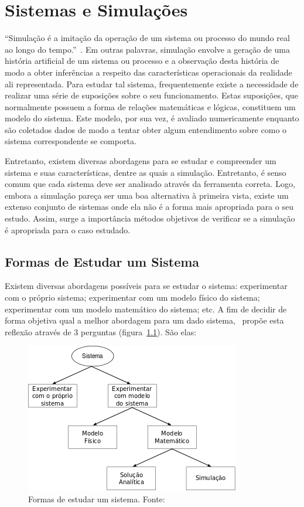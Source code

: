 \chapter{\label{chap:simulation}Sistemas e Simulações}

``Simulação é a imitação da operação de um sistema ou processo do mundo real ao
longo do tempo.''~\cite{Banks}. Em outras palavras, simulação envolve a geração
de uma história artificial de um sistema ou processo e a observação desta
história de modo a obter inferências a respeito das características operacionais
da realidade ali representada. Para estudar tal sistema, frequentemente existe a
necessidade de realizar uma série de suposições sobre o seu funcionamento. Estas
suposições, que normalmente possuem a forma de relações matemáticas e lógicas,
constituem um modelo do sistema. Este modelo, por sua vez, é avaliado
numericamente enquanto são coletados dados de modo a tentar obter algum
entendimento sobre como o sistema correspondente se comporta.

Entretanto, existem diversas abordagens para se estudar e compreender um sistema
e suas características, dentre as quais a simulação. Entretanto, é senso comum
que cada sistema deve ser analisado através da ferramenta correta. Logo, embora
a simulação pareça ser uma boa alternativa à primeira vista, existe um extenso
conjunto de sistemas onde ela não é a forma mais apropriada para o seu estudo.
Assim, surge a importância métodos objetivos de verificar se a simulação é
apropriada para o caso estudado.

\section{\label{chap:waystostudy}Formas de Estudar um Sistema}

Existem diversas abordagens possíveis para se estudar o sistema: experimentar
com o próprio sistema; experimentar com um modelo físico do sistema;
experimentar com um modelo matemático do sistema; etc. A fim de decidir de forma
objetiva qual a melhor abordagem para um dado sistema,~\cite{Law} propõe esta
reflexão através de 3 perguntas (figura~\ref{fig:systemstudy}). São elas:

\begin{figure}[htb!]
\centering\includegraphics{img/systemstudy.png}
\caption{\label{fig:systemstudy}Formas de estudar um sistema. Fonte:~\cite{Law}}
\end{figure}

